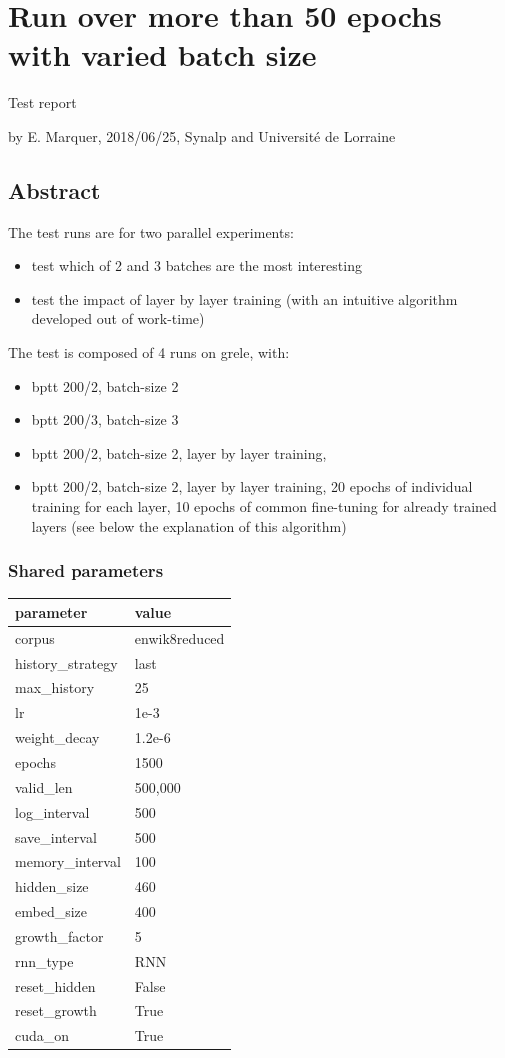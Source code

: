 \section*{Run over more than 50 epochs with varied batch
size}

Test report

by E. Marquer, 2018/06/25, Synalp and Université de Lorraine

\subsection{Abstract}

The test runs are for two parallel experiments:
\begin{itemize}
\item test which of 2 and 3
batches are the most interesting
\item test the impact of layer by layer
training (with an intuitive algorithm developed out of work-time)
\end{itemize}

The test is composed of 4 runs on grele, with:
\begin{itemize}
\item bptt 200/2, batch-size
2
\item bptt 200/3, batch-size 3
\item bptt 200/2, batch-size 2, layer by layer
training,
\item bptt 200/2, batch-size 2, layer by layer training, 20 epochs
of individual training for each layer, 10 epochs of common fine-tuning
for already trained layers (see below the explanation of this algorithm)
\end{itemize}

\subsubsection{Shared parameters}

\begin{longtable}[]{@{}ll@{}}
\hline
parameter & value\tabularnewline
\hline
\endhead
corpus & enwik8reduced\tabularnewline
history\_strategy & last\tabularnewline
max\_history & 25\tabularnewline
lr & 1e-3\tabularnewline
weight\_decay & 1.2e-6\tabularnewline
epochs & 1500\tabularnewline
valid\_len & 500,000\tabularnewline
log\_interval & 500\tabularnewline
save\_interval & 500\tabularnewline
memory\_interval & 100\tabularnewline
hidden\_size & 460\tabularnewline
embed\_size & 400\tabularnewline
growth\_factor & 5\tabularnewline
rnn\_type & RNN\tabularnewline
reset\_hidden & False\tabularnewline
reset\_growth & True\tabularnewline
cuda\_on & True\tabularnewline
\hline
\end{longtable}

